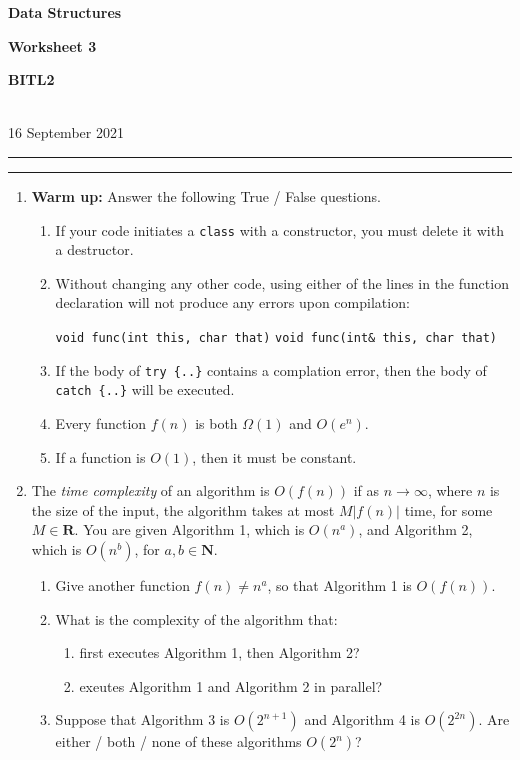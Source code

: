 \documentclass[a4paper,12pt]{article}
\newcommand\N{\mathbf{N}}
\newcommand\R{\mathbf{R}}
\begin{document}
\begin{center}
\parbox{3.5cm}{\textbf{Data Structures}} \hfill {\bf\Huge Worksheet 3} \hfill \parbox{3.5cm}{\flushright\textbf{BITL2}} \\[5pt]
\rm\small 16 September 2021
\end{center}

\hrule\vspace{2pt}\hrule

\begin{enumerate}

\item \textbf{Warm up:} Answer the following True / False questions.
\begin{enumerate}
\item If your code initiates a \texttt{class} with a constructor, you must delete it with a destructor.
\item Without changing any other code, using either of the lines in the function declaration will not produce any errors upon compilation:
\begin{center}
\texttt{void func(int this, char that)}
\hspace{1cm}
\texttt{void func(int\& this, char that)}
\end{center}
\item If the body of \texttt{try \{..\}} contains a complation error, then the body of  \texttt{catch \{..\}} will be executed. 
\item Every function $f(n)$ is both $\Omega(1)$ and $O(e^n)$.
\item If a function is $O(1)$, then it must be constant.
\end{enumerate}

\item The \textit{time complexity} of an algorithm is $O(f(n))$ if as $n\to\infty$, where $n$ is the size of the input, the algorithm takes at most $M|f(n)|$ time, for some $M\in \R$. You are given Algorithm 1, which is $O(n^a)$, and Algorithm 2, which is $O(n^b)$, for $a,b\in \N$.
\begin{enumerate}
\item Give another function $f(n) \neq n^a$, so that Algorithm 1 is $O(f(n))$.
\item What is the complexity of the algorithm that:
\begin{enumerate}
\item first executes Algorithm 1, then Algorithm 2? 
\item exeutes Algorithm 1 and Algorithm 2 in parallel?
\end{enumerate}
\item Suppose that Algorithm 3 is $O(2^{n+1})$ and Algorithm 4 is $O(2^{2n})$. Are either / both / none of these algorithms $O(2^n)$?
\end{enumerate}


\end{enumerate}
\end{document}
